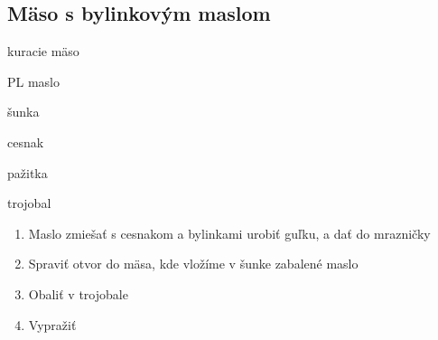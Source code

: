 \setcounter{step}{0}
\subsection{Mäso s bylinkovým maslom}

\begin{ingredient}
\def\portions{4}%

\begin{main}
	\item kuracie mäso
	\item PL maslo
	\item šunka
	\item cesnak
	\item pažitka
	\item trojobal
\end{main}
\end{ingredient}
\begin{recipe}

\begin{enumerate}

\item{Maslo zmiešať s cesnakom a bylinkami urobiť guľku, a dať do mrazničky}
\item{Spraviť otvor do mäsa, kde vložíme v šunke zabalené maslo}
\item{Obaliť v trojobale}	
\item{Vypražiť}

\end{enumerate}
\end{recipe}

\begin{notes}

\end{notes}
\clearpage	